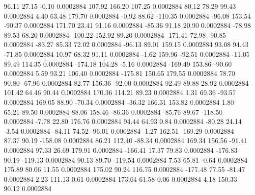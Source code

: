        96.11       27.15       -0.10     0.0002884
      107.92      166.20      107.25     0.0002884
       80.12       78.29       99.43     0.0002884
        4.40       63.48      179.70     0.0002884
       -0.92       88.62     -110.35     0.0002884
      -96.08      153.54      -90.37     0.0002884
      171.70       23.41       91.16     0.0002884
      -85.36       91.18       20.90     0.0002884
      -78.98       89.53       68.20     0.0002884
     -100.22      152.92       89.20     0.0002884
     -171.41       72.98      -90.85     0.0002884
      -83.27       85.33       72.02     0.0002884
      -96.13       89.01      159.15     0.0002884
       93.08       94.43      -71.85     0.0002884
       10.97       68.32       91.11     0.0002884
       -1.62      159.96      -92.51     0.0002884
      -11.05       89.49      114.35     0.0002884
     -174.18      104.28       -5.16     0.0002884
     -169.49      153.86      -90.60     0.0002884
        5.59       93.21      106.40     0.0002884
     -175.81      150.65      179.55     0.0002884
       78.70       90.80      -67.96     0.0002884
       82.77      156.36      -92.00     0.0002884
       92.49       89.88       28.92     0.0002884
      101.42       64.46       90.44     0.0002884
      170.36      114.21       89.23     0.0002884
        1.31       69.36      -93.57     0.0002884
      169.05       88.90      -70.34     0.0002884
      -36.32      166.31      153.82     0.0002884
        1.80       65.21       89.50     0.0002884
       88.06      158.46      -86.36     0.0002884
      -85.76       89.67     -118.50     0.0002884
       -7.78       22.80      176.76     0.0002884
       94.44       64.93        0.84     0.0002884
      -80.28       24.14       -3.54     0.0002884
      -84.11       74.52      -96.01     0.0002884
       -1.27      162.51     -169.29     0.0002884
       87.37       90.19     -158.08     0.0002884
       86.21      112.40      -88.34     0.0002884
      169.34      156.56      -91.41     0.0002884
       97.33       26.69      179.91     0.0002884
     -166.41       17.37       79.83     0.0002884
     -176.83       90.19     -119.13     0.0002884
       90.13       89.70     -119.54     0.0002884
        7.53       65.81       -0.64     0.0002884
      175.89       80.06       11.55     0.0002884
      175.02       90.24      116.75     0.0002884
     -177.48       77.55      -81.47     0.0002884
        2.23      111.13        0.61     0.0002884
      173.64       61.58        0.06     0.0002884
        4.18      150.33       90.12     0.0002884
